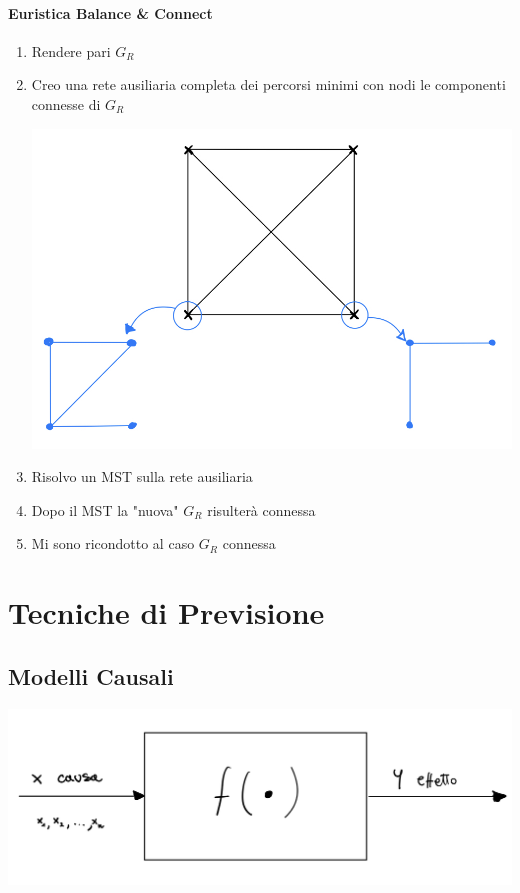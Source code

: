 \documentclass[12pt,a4paper]{article}
\begin{document}
\paragraph{Euristica Balance \& Connect}
\begin{enumerate}
\item Rendere pari $G_R$
\item Creo una rete ausiliaria completa dei percorsi minimi con nodi le componenti connesse di $G_R$
\begin{center}
\includegraphics[width=0.3\columnwidth]{img/rpp_rete_ausiliaria.jpeg}\\
\end{center}
\item Risolvo un MST sulla rete ausiliaria
\item Dopo il MST la "nuova" $G_R$ risulterà connessa
\item Mi sono ricondotto al caso $G_R$ connessa
\end{enumerate}

\clearpage
\section{Tecniche di Previsione}
\subsection{Modelli Causali}
\begin{center}
\includegraphics[width=0.6\columnwidth]{img/mod_causali.jpeg}\\
\end{center}
\end{document}

